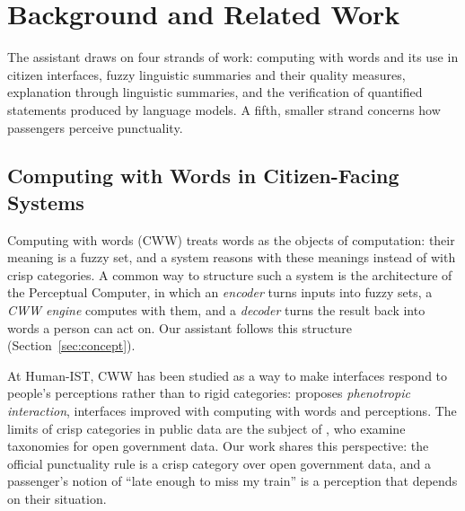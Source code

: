 \section{Background and Related Work}
\label{sec:related}

The assistant draws on four strands of work: computing with words and its use in citizen
interfaces, fuzzy linguistic summaries and their quality measures, explanation through
linguistic summaries, and the verification of quantified statements produced by language
models. A fifth, smaller strand concerns how passengers perceive punctuality.

\subsection{Computing with Words in Citizen-Facing Systems}
\label{sec:rw-cww}
Computing with words (CWW) treats words as the objects of computation: their meaning is a
fuzzy set, and a system reasons with these meanings instead of with crisp categories. A
common way to structure such a system is the architecture of the Perceptual Computer, in
which an \emph{encoder} turns inputs into fuzzy sets, a \emph{CWW engine} computes with
them, and a \emph{decoder} turns the result back into words a person can act on. Our
assistant follows this structure (Section~\ref{sec:concept}).

At Human-IST, CWW has been studied as a way to make interfaces respond to people's
perceptions rather than to rigid categories: \citet{colombo2024} proposes \emph{phenotropic
interaction}, interfaces improved with computing with words and perceptions. The limits of
crisp categories in public data are the subject of \citet{spycher2026}, who examine
taxonomies for open government data. Our work shares this perspective: the official
punctuality rule is a crisp category over open government data, and a passenger's notion of
``late enough to miss my train'' is a perception that depends on their situation.

